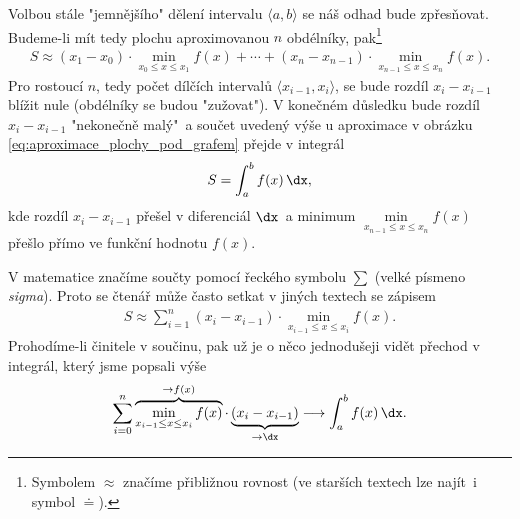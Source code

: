 Volbou stále "jemnějšího" dělení intervalu $\langle a,b \rangle$ se náš odhad bude zpřesňovat. Budeme-li mít tedy plochu aproximovanou $n$ obdélníky, pak\footnote{Symbolem $\approx$ značíme přibližnou rovnost (ve starších textech lze najít~i symbol $\doteq$).}
\begin{align}
\label{eq:aproximace_plochy_pod_grafem}
S \approx (x_1-x_0) \cdot \min\limits_{x_{0} \leq x \leq x_1}{f(x)} +\cdots + (x_n-x_{n-1}) \cdot \min\limits_{x_{n-1} \leq x \leq x_n}{f(x)}.
\end{align}
Pro rostoucí $n$, tedy počet dílčích intervalů $\langle x_{i-1},x_i \rangle$, se bude rozdíl $x_i-x_{i-1}$ blížit nule (obdélníky se budou "zužovat"). V konečném důsledku bude rozdíl $x_i-x_{i-1}$ "nekonečně malý"~a součet uvedený výše u aproximace v obrázku \ref{eq:aproximace_plochy_pod_grafem} přejde v integrál
\begin{align*}
S=\int_{a}^{b}{f(x)\,\dx},
\end{align*}
kde rozdíl $x_i-x_{i-1}$ přešel v diferenciál $\dx$~a minimum $\min\limits_{x_{n-1} \leq x \leq x_n}{f(x)}$ přešlo přímo ve funkční hodnotu $f(x)$.\par
V matematice značíme součty pomocí řeckého symbolu $\sum$ (velké písmeno \emph{sigma}). Proto se čtenář může často setkat v jiných textech se zápisem
\begin{align*}
S \approx \sum_{i=1}^{n}{(x_i-x_{i-1}) \cdot \min\limits_{x_{i-1} \leq x \leq x_i}{f(x)}}.
\end{align*}
Prohodíme-li činitele v součinu, pak už je o něco jednodušeji vidět přechod v integrál, který jsme popsali výše
\begin{align*}
\sum_{i=0}^{n}{\overbrace{\min\limits_{x_{i-1} \leq x \leq x_i}{f(x)}}^{\rightarrow f(x)} \cdot \underbrace{(x_i-x_{i-1})}_{\rightarrow \dx}} \longrightarrow \int_{a}^{b}{f(x)\,\dx}.
\end{align*}

